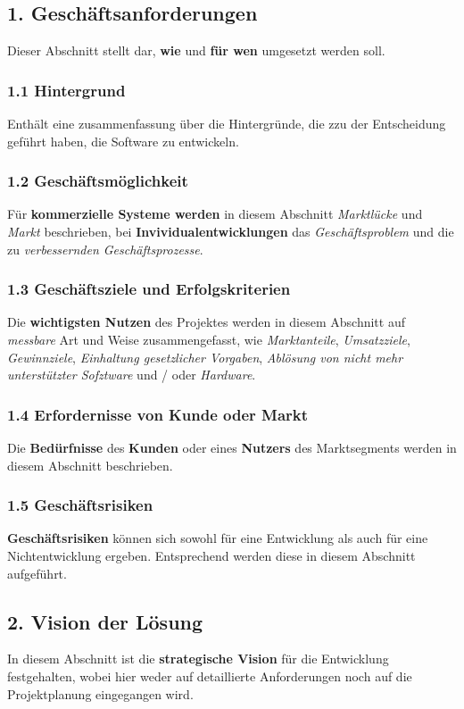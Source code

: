 \subsection*{1. Geschäftsanforderungen}
Dieser Abschnitt stellt dar, \textbf{wie} und \textbf{für wen} umgesetzt werden soll.

\subsubsection*{1.1 Hintergrund}
Enthält eine zusammenfassung über die Hintergründe, die zzu der Entscheidung geführt haben, die Software zu entwickeln.

\subsubsection*{1.2 Geschäftsmöglichkeit}
Für \textbf{kommerzielle Systeme werden} in diesem Abschnitt \textit{Marktlücke} und \textit{Markt} beschrieben, bei \textbf{Invividualentwicklungen} das \textit{Geschäftsproblem} und die zu \textit{verbessernden Geschäftsprozesse}.

\subsubsection*{1.3 Geschäftsziele und Erfolgskriterien}
Die \textbf{wichtigsten Nutzen} des Projektes werden in diesem Abschnitt auf \textit{messbare} Art und Weise zusammengefasst, wie \textit{Marktanteile}, \textit{Umsatzziele}, \textit{Gewinnziele}, \textit{Einhaltung gesetzlicher Vorgaben}, \textit{Ablösung von nicht mehr unterstützter Sofztware} und / oder \textit{Hardware}.

\subsubsection*{1.4 Erfordernisse von Kunde oder Markt}
Die \textbf{Bedürfnisse} des \textbf{Kunden} oder eines \textbf{Nutzers} des Marktsegments werden in diesem Abschnitt beschrieben.

\subsubsection*{1.5 Geschäftsrisiken}
\textbf{Geschäftsrisiken} können sich sowohl für eine Entwicklung als auch für eine Nichtentwicklung ergeben.
Entsprechend werden diese in diesem Abschnitt aufgeführt.

\subsection*{2. Vision der Lösung}
In diesem Abschnitt ist die \textbf{strategische Vision} für die Entwicklung festgehalten, wobei hier weder auf  detaillierte Anforderungen noch auf die Projektplanung eingegangen wird.

